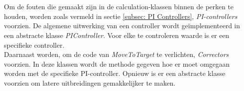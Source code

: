 \\
\\
Om de fouten die gemaakt zijn in de calculation-klassen binnen de perken te houden, worden zoals vermeld in sectie \ref{subsec: PI Controllers}, \textit{PI-controllers} voorzien. De algemene uitwerking van een controller wordt geïmplementeerd in een abstracte klasse \textit{PIController}. Voor elke te controleren waarde is er een specifieke controller. 
\\
Daarnaast worden, om de code van \textit{MoveToTarget} te verlichten, \textit{Correctors} voorzien. In deze klassen wordt de methode gegeven hoe er moet omgegaan worden met de specifieke PI-controller. Opnieuw is er een abstracte klasse voorzien om latere uitbreidingen gemakkelijker te maken. 
